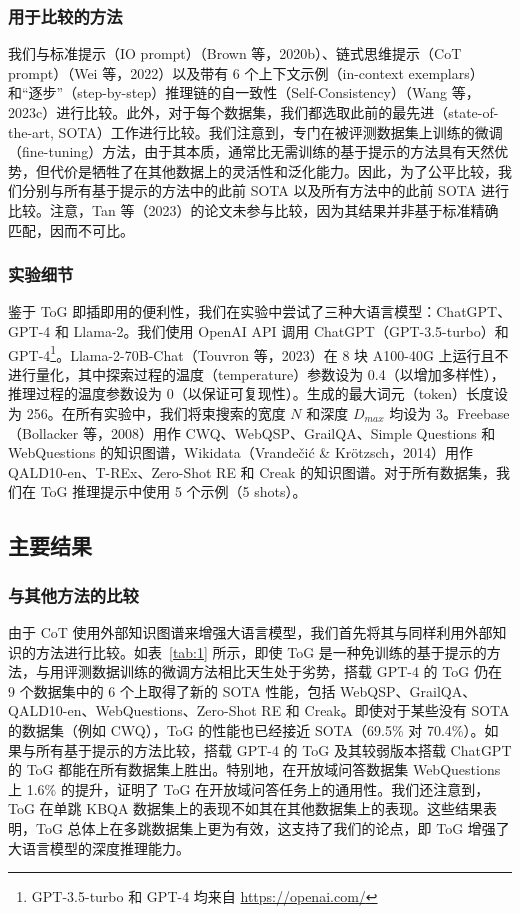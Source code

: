 \documentclass[11pt,UTF8,fontset=fandol]{ctexart}
\begin{document}
\subsubsection{用于比较的方法}

我们与标准提示（IO prompt）（Brown 等，2020b）、链式思维提示（CoT prompt）（Wei 等，2022）以及带有 6 个上下文示例（in-context exemplars）和“逐步”（step-by-step）推理链的自一致性（Self-Consistency）（Wang 等，2023c）进行比较。此外，对于每个数据集，我们都选取此前的最先进（state-of-the-art, SOTA）工作进行比较。我们注意到，专门在被评测数据集上训练的微调（fine-tuning）方法，由于其本质，通常比无需训练的基于提示的方法具有天然优势，但代价是牺牲了在其他数据上的灵活性和泛化能力。因此，为了公平比较，我们分别与所有基于提示的方法中的此前 SOTA 以及所有方法中的此前 SOTA 进行比较。注意，Tan 等（2023）的论文未参与比较，因为其结果并非基于标准精确匹配，因而不可比。

\subsubsection{实验细节}

鉴于 ToG 即插即用的便利性，我们在实验中尝试了三种大语言模型：ChatGPT、GPT-4 和 Llama-2。我们使用 OpenAI API 调用 ChatGPT（GPT-3.5-turbo）和 GPT-4\footnote{GPT-3.5-turbo 和 GPT-4 均来自 \url{https://openai.com/}}。Llama-2-70B-Chat（Touvron 等，2023）在 8 块 A100-40G 上运行且不进行量化，其中探索过程的温度（temperature）参数设为 0.4（以增加多样性），推理过程的温度参数设为 0（以保证可复现性）。生成的最大词元（token）长度设为 256。在所有实验中，我们将束搜索的宽度 $N$ 和深度 $D_{max}$ 均设为 3。Freebase（Bollacker 等，2008）用作 CWQ、WebQSP、GrailQA、Simple Questions 和 WebQuestions 的知识图谱，Wikidata（Vrande\v{c}i\'{c} \& Kr\"{o}tzsch，2014）用作 QALD10-en、T-REx、Zero-Shot RE 和 Creak 的知识图谱。对于所有数据集，我们在 ToG 推理提示中使用 5 个示例（5 shots）。

\subsection{主要结果}

\subsubsection{与其他方法的比较}

由于 CoT 使用外部知识图谱来增强大语言模型，我们首先将其与同样利用外部知识的方法进行比较。如表~\ref{tab:1} 所示，即使 ToG 是一种免训练的基于提示的方法，与用评测数据训练的微调方法相比天生处于劣势，搭载 GPT-4 的 ToG 仍在 9 个数据集中的 6 个上取得了新的 SOTA 性能，包括 WebQSP、GrailQA、QALD10-en、WebQuestions、Zero-Shot RE 和 Creak。即使对于某些没有 SOTA 的数据集（例如 CWQ），ToG 的性能也已经接近 SOTA（69.5\% 对 70.4\%）。如果与所有基于提示的方法比较，搭载 GPT-4 的 ToG 及其较弱版本搭载 ChatGPT 的 ToG 都能在所有数据集上胜出。特别地，在开放域问答数据集 WebQuestions 上 1.6\% 的提升，证明了 ToG 在开放域问答任务上的通用性。我们还注意到，ToG 在单跳 KBQA 数据集上的表现不如其在其他数据集上的表现。这些结果表明，ToG 总体上在多跳数据集上更为有效，这支持了我们的论点，即 ToG 增强了大语言模型的深度推理能力。
\end{document}
